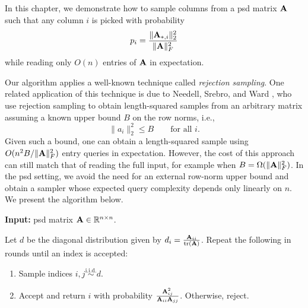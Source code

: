 In this chapter, we demonstrate how to sample columns from a psd matrix $\mathbf{A}$ such that any column $i$ is picked with probability
\[p_i = \frac{\|\mathbf{A}_{*, i}\|^2_2}{\|\mathbf{A}\|^2_F}\]
while reading only $O(n)$ entries of $\mathbf{A}$ in expectation. 


Our algorithm applies a well-known technique called \textit{rejection sampling}. One related application of this technique is due to Needell, Srebro, and Ward \cite{needell_stochastic_2015}, who use rejection sampling to obtain length-squared samples from an arbitrary matrix assuming a known upper bound $B$ on the row norms, i.e., 
\[\|a_i\|^2_2\leq B\qquad\text{for all $i$.}\]
Given such a bound, one can obtain a length-squared sample using $O(n^2B/\|\mathbf{A}\|^2_F)$ entry queries in expectation. However, the cost of this approach can still match that of reading the full input, for example when $B = \Omega(\|\mathbf{A}\|_F^2)$. In the psd setting, we avoid the need for an external row-norm upper bound and obtain a sampler whose expected query complexity depends only linearly on $n$. We present the algorithm below.

\begin{algorithm}[H]
\caption{Fast Length-Squared Sampling}
\label{alg:sampling-procedure}

\textbf{Input:} psd matrix
\(\mathbf{A}\in\mathbb{R}^{n\times n}\).
\smallskip

\noindent
Let \(d\) be the diagonal distribution given by $d_i = \frac{\mathbf{A}_{ii}}{\tr(\mathbf{A})}$.
Repeat the following in rounds until an index is accepted:
\begin{enumerate}[
    label=\arabic*.,
    leftmargin=2em,
    itemsep=0.35em,
    topsep=0.45em,
    parsep=0pt
]
    \item Sample indices \(i,j \overset{\mathrm{i.i.d.}}{\sim} d\).

    \item Accept and return \(i\) with probability
    $\frac{\mathbf{A}_{ij}^2}{\mathbf{A}_{ii}\mathbf{A}_{jj}}$.
    Otherwise, reject.
\end{enumerate}
\end{algorithm}

